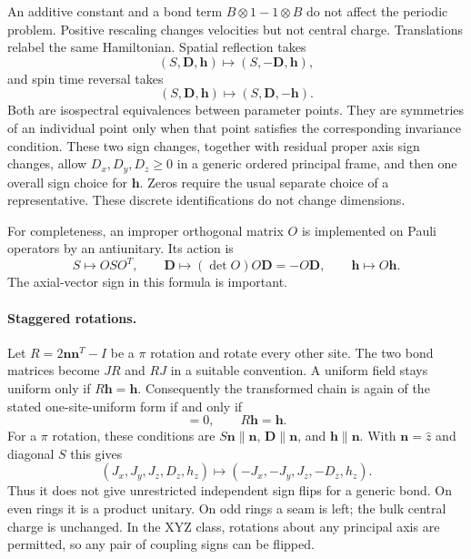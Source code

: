 \documentclass[11pt]{article}
\newcommand{\nn}{\boldsymbol n}
\newcommand{\DD}{\boldsymbol D}
\newcommand{\hh}{\boldsymbol h}
\begin{document}
An additive constant and a bond term $B\otimes1-1\otimes B$ do not affect the
periodic problem. Positive rescaling changes velocities but not central charge.
Translations relabel the same Hamiltonian. Spatial reflection takes
\begin{equation}
 (S,\DD,\hh)\longmapsto(S,-\DD,\hh),
\end{equation}
and spin time reversal takes
\begin{equation}
 (S,\DD,\hh)\longmapsto(S,\DD,-\hh).
\end{equation}
Both are isospectral equivalences between parameter points. They are symmetries
of an individual point only when that point satisfies the corresponding
invariance condition. These two sign changes, together with residual proper
axis sign changes, allow $D_x,D_y,D_z\geq0$ in a generic ordered principal frame,
and then one overall sign choice for $\hh$. Zeros require the usual separate
choice of a representative. These discrete identifications do not change
dimensions.

For completeness, an improper orthogonal matrix $O$ is implemented on Pauli
operators by an antiunitary. Its action is
\begin{equation}
 S\mapsto OSO^T,\qquad \DD\mapsto (\det O)O\DD=-O\DD,
 \qquad\hh\mapsto O\hh. \label{eq:anti}
\end{equation}
The axial-vector sign in this formula is important.

\paragraph{Staggered rotations.}
Let $R=2\nn\nn^T-I$ be a $\pi$ rotation and rotate every other site. The two bond
matrices become $JR$ and $RJ$ in a suitable convention. A uniform field stays
uniform only if $R\hh=\hh$. Consequently the transformed chain is again of
the stated one-site-uniform form if and only if
\begin{equation}
 [J,R]=0,\qquad R\hh=\hh.
 \label{eq:stagger}
\end{equation}
For a $\pi$ rotation, these conditions are
$S\nn\parallel\nn$, $\DD\parallel\nn$, and $\hh\parallel\nn$.
With $\nn=\hat z$ and diagonal $S$ this gives
\begin{equation}
 (J_x,J_y,J_z,D_z,h_z)\mapsto(-J_x,-J_y,J_z,-D_z,h_z).
\end{equation}
Thus it does not give unrestricted independent sign flips for a generic bond.
On even rings it is a product unitary. On odd rings a seam is left; the bulk
central charge is unchanged. In the XYZ class, rotations about any principal
axis are permitted, so any pair of coupling signs can be flipped.
\end{document}
